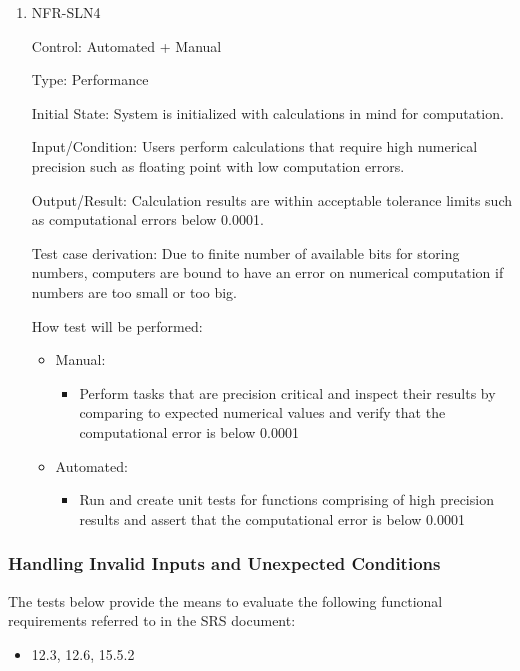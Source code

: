 \documentclass[12pt, titlepage]{article}
\begin{document}
\begin{enumerate}
\item NFR-SLN4

Control: Automated + Manual

Type: Performance

Initial State: System is initialized with calculations in mind for computation.

Input/Condition: Users perform calculations that require high numerical precision such as floating point with low computation errors.

Output/Result: Calculation results are within acceptable tolerance limits such as computational errors below 0.0001.

Test case derivation: Due to finite number of available bits for storing numbers, computers are bound to have an error on numerical computation if numbers are too small or too big.

How test will be performed:
\begin{itemize}
  \item Manual:
  \begin{itemize}
    \item Perform tasks that are precision critical and inspect their results by comparing to expected numerical values and verify that the computational error is below 0.0001
  \end{itemize}
  \item Automated:
  \begin{itemize}
    \item Run and create unit tests for functions comprising of high precision results and assert that the computational error is below 0.0001
  \end{itemize}
\end{itemize}

\end{enumerate}

\subsubsection{Handling Invalid Inputs and Unexpected Conditions}

The tests below provide the means to evaluate the following functional requirements referred to in the SRS document:
\begin{itemize}
  \item 12.3, 12.6, 15.5.2
\end{itemize}
\end{document}
